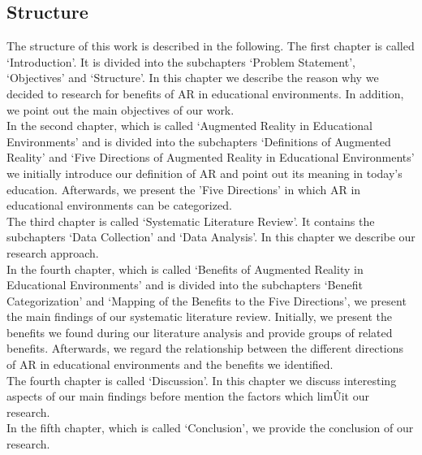 \subsection{Structure}
The structure of this work is described in the following. The first chapter is called ‘Introduction’. It is divided into the subchapters ‘Problem Statement’, ‘Objectives’ and ‘Structure’. In this chapter we describe the reason why we decided to research for benefits of AR in educational environments. In addition, we point out the main objectives of our work.\\
In the second chapter, which is called ‘Augmented Reality in Educational Environments’ and is divided into the subchapters ‘Definitions of Augmented Reality’ and ‘Five Directions of Augmented Reality in Educational Environments’ we initially introduce our definition of AR and point out its meaning in today's education. Afterwards, we present the 'Five Directions' \autocite [cf.]{Yuen.2011} in which AR in educational environments can be categorized.\\
The third chapter is called ‘Systematic Literature Review’. It contains the subchapters ‘Data Collection’ and ‘Data Analysis’. In this chapter we describe our research approach.\\
In the fourth chapter, which is called ‘Benefits of Augmented Reality in Educational Environments’ and is divided into the subchapters ‘Benefit Categorization’ and ‘Mapping of the Benefits to the Five Directions’, we present the main findings of our systematic literature review. Initially, we present the benefits we found during our literature analysis and provide groups of related benefits. Afterwards, we regard the relationship between the different directions of AR in educational environments and the benefits we identified.\\
The fourth chapter is called ‘Discussion’. In this chapter we discuss interesting aspects of our main findings before mention the factors which limÛit our research.\\
In the fifth chapter, which is called ‘Conclusion’, we provide the conclusion of our research.